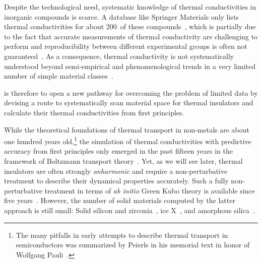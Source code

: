 Despite the technological need, systematic knowledge of thermal conductivities in inorganic compounds is scarce. A database like Springer Materials only lists thermal conductivities for about 200~of these compounds~\cite{SpringerMaterials}, which is partially due to the fact that accurate measurements of thermal conductivity are challenging to perform and reproducibility between different experimental groups is often not guaranteed~\cite{Wei.2016}. As a consequence, thermal conductivity is not systematically understood beyond semi-empirical and phenomenological trends in a very limited number of simple material classes~\cite{Morelli.2006}.

 is therefore to open a new pathway for overcoming the problem of limited data by devising a route to systematically scan material space for thermal insulators and calculate their thermal conductivities from first principles. 

While the theoretical foundations of thermal transport in non-metals are about one hundred years old,\footnote{The many pitfalls in early attempts to describe thermal transport in semiconductors was summarized by Peierls in his memorial text in honor of Wolfgang Pauli~\cite{Peierls1960}.} the simulation of thermal conductivities with predictive accuracy from first principles only emerged in the past fifteen years in the framework of Boltzmann transport theory~\cite{Broido.2007}. Yet, as we will see later, thermal insulators are often strongly \emph{anharmonic} and require a non-perturbative treatment to describe their dynamical properties accurately. Such a fully non-perturbative treatment in terms of \emph{ab initio} Green Kubo theory is available since five years~\cite{Marcolongo.2016,Carbogno.2016}. However, the number of solid materials computed by the latter approach is still small: Solid silicon and zirconia~\cite{Carbogno.2016}, ice X~\cite{Grasselli.2020}, and amorphous silica~\cite{Marcolongo.2020}. 

